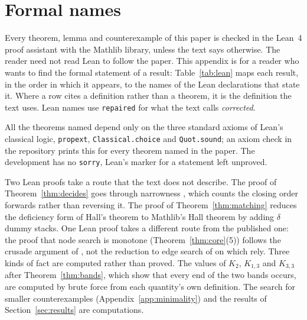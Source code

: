 \section{Formal names}
\label{app:lean}

Every theorem, lemma and counterexample of this paper is checked in the Lean~4
proof assistant with the Mathlib library, unless the text says otherwise. The
reader need not read Lean to follow the paper. This appendix is for a reader
who wants to find the formal statement of a result: Table~\ref{tab:lean} maps
each result, in the order in which it appears, to the names of the Lean
declarations that state it. Where a row cites a definition rather than a
theorem, it is the definition the text uses. Lean names use \texttt{repaired}
for what the text calls \emph{corrected}.

All the theorems named depend only on the three standard axioms of Lean's
classical logic, \texttt{propext}, \texttt{Classical.choice} and
\texttt{Quot.sound}; an axiom check in the repository prints this for every
theorem named in the paper. The development has no \texttt{sorry}, Lean's marker for a statement left
unproved.

Two Lean proofs take a route that the text does not describe. The proof of
Theorem~\ref{thm:decides} goes through narrowness \citep{LY2002ref11}, which
counts the closing order forwards rather than reversing it. The proof of
Theorem~\ref{thm:matching} reduces the deficiency form of Hall's theorem to
Mathlib's Hall theorem by adding $\delta$ dummy stacks. One Lean proof takes a
different route from the published one: the proof
that node search is monotone (Theorem~\ref{thm:core}(5)) follows the crusade
argument of \citet{BienstockSeymour1991}, not the reduction to edge search of
\citet{LaPaugh1993} on which \citet{LY2002ref10} rely. Three kinds of fact
are computed rather than proved. The values of $K_2$, $K_{1,3}$ and $K_{3,3}$
after Theorem~\ref{thm:bands}, which show that every end of the two bands
occurs, are computed by brute force from each quantity's own definition. The
search for smaller counterexamples (Appendix~\ref{app:minimality}) and the
results of Section~\ref{sec:results} are computations.

